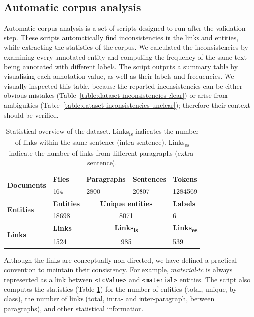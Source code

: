 \subsection{Automatic corpus analysis}
Automatic corpus analysis is a set of scripts designed to run after the validation step. 
These scripts automatically find inconsistencies in the links and entities, while extracting the statistics of the corpus. 
We calculated the inconsistencies by examining every annotated entity and computing the frequency of the same text being annotated with different labels. 
The script outputs a summary table by visualising each annotation value, as well as their labels and frequencies.
We visually inspected this table, because the reported inconsistencies can be either obvious mistakes (Table~\ref{table:dataset-inconsistencies-clear}) or arise from ambiguities (Table~\ref{table:dataset-inconsistencies-unclear}); therefore their context should be verified. 

\begin{table}[htbp]
    \caption{Statistical overview of the dataset. 
    Links\textsubscript{is} indicates the number of links within the same sentence (intra-sentence). Links\textsubscript{es} indicate the number of links from different paragraphs  (extra-sentence).  }
    \begin{tabular}{ m{6em}   m{4em}  m{6em}  m{7em}  m{6em} } 
    \toprule
        \multirow{2}{5em}{\textbf{Documents}} & \textbf{Files} & \textbf{Paragraphs} &	\textbf{Sentences} & \textbf{Tokens}\\
         & 164  &	2800 & 	20807 & 	1284569\\
    \midrule
        \multirow{2}{5em}{\textbf{Entities}} & \textbf{Entities} &  \multicolumn{2}{|c|}{\textbf{Unique entities}} &  \textbf{ Labels} \\
        & 18698 &  \multicolumn{2}{c}{8071} &  6 \\
    \midrule
        \multirow{2}{5em}{\textbf{Links}} & \textbf{Links} & \multicolumn{2}{|c|}{\textbf{Links\textsubscript{is}}} 
        & \textbf{Links\textsubscript{es}}\\
        & 1524  & \multicolumn{2}{c}{985} &	539	\\
    \bottomrule
    \end{tabular}
    \label{table:summary-content}
\end{table}

Although the links are conceptually non-directed, we have defined a practical convention to maintain their consistency. For example, \textit{material-tc} is always represented as a link between \texttt{<tcValue>} and \texttt{<material>} entities. 
The script also computes the statistics (Table \ref{table:summary-content}) for the number of entities (total, unique, by class), the number of links (total, intra- and inter-paragraph, between paragraphs), and other statistical information. 

